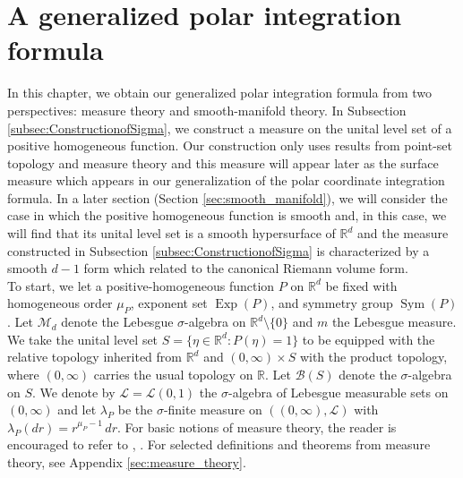 \documentclass[11pt, letter]{book}
\newcommand\Sym{\operatorname{Sym}}
\newcommand\Exp{\operatorname{Exp}}
\begin{document}
\chapter{A generalized polar integration formula}\label{chap:formula}

In this chapter, we obtain our generalized polar integration formula from two perspectives: measure theory and smooth-manifold theory. In Subsection \ref{subsec:ConstructionofSigma}, we construct a measure on the unital level set of a positive homogeneous function. Our construction only uses results from point-set topology and measure theory and this measure will appear later as the surface measure which appears in our generalization of the polar coordinate integration formula. In a later section (Section \ref{sec:smooth_manifold}), we will consider the case in which the positive homogeneous function is smooth and, in this case, we will find that its unital level set is a smooth hypersurface of $\mathbb{R}^d$ and the measure constructed in Subsection \ref{subsec:ConstructionofSigma} is characterized by a smooth $d-1$ form which related to the canonical Riemann volume form. \\

\noindent To start, we let a positive-homogeneous function $P$ on $\mathbb{R}^d$ be fixed with homogeneous order $\mu_P$, exponent set $\Exp(P)$, and symmetry group $\Sym{(P)}$. Let $\mathcal{M}_d$ denote the Lebesgue $\sigma$-algebra on $\mathbb{R}^d\setminus\{ 0 \}$ and $m$ the Lebesgue measure. We take the unital level set $S = \{ \eta\in \mathbb{R}^d : P(\eta) = 1 \}$ to be equipped with the relative topology inherited from $\mathbb{R}^d$ and $(0,\infty)\times S$ with the product topology, where $(0,\infty)$ carries the usual topology on $\mathbb{R}$. Let $\mathcal{B}(S)$ denote the $\sigma$-algebra on $S$. We denote by $\mathcal{L}=\mathcal{L}(0,1)$ the $\sigma$-algebra of Lebesgue measurable sets on $(0,\infty)$ and let $\lambda_P$ be the $\sigma$-finite measure on $((0,\infty),\mathcal{L})$ with $\lambda_P(dr)=r^{\mu_P-1}\,dr$. For basic notions of measure theory, the reader is encouraged to refer to \cite{bogachev_measure_2007}, \cite{stein_real_2009}. For selected definitions and theorems from measure theory, see Appendix \ref{sec:measure_theory}.

\end{document}
